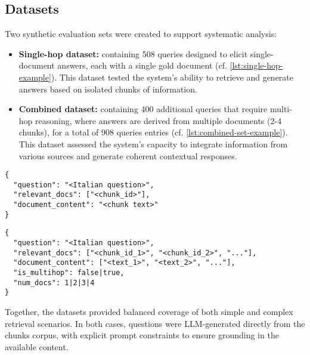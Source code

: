 \begin{spacing}{1.5}
\subsection{Datasets}\label{sec:datasets}

Two synthetic evaluation sets were created to support systematic analysis:
\begin{itemize}
      \item \textbf{Single-hop dataset:} containing 508 queries designed to elicit single-document answers, each with a single gold document (cf. \autoref{lst:single-hop-example}). This dataset tested the system's ability to retrieve and generate answers based on isolated chunks of information.
      \item \textbf{Combined dataset:} containing 400 additional queries that require multi-hop reasoning, where answers are derived from multiple documents (2-4 chunks), for a total of 908 queries entries (cf. \autoref{lst:combined-set-example}). This dataset assessed the system's capacity to integrate information from various sources and generate coherent contextual responses.
\end{itemize}


\begin{lstlisting}[frame=none,
                   caption={JSON output format for single-hop dataset items.},
                   captionpos=b,
                   label={lst:single-hop-example},
  xleftmargin=0.2\textwidth,
  xrightmargin=0.2\textwidth]
{
  "question": "<Italian question>",
  "relevant_docs": ["<chunk_id>"],
  "document_content": "<chunk text>"
}
\end{lstlisting}

\vspace{0.6em}

\begin{lstlisting}[frame=none,
                   caption={JSON output format for combined dataset items, including single-hop and multi-hop questions.},
                   captionpos=b,
                   label={lst:combined-set-example},
  xleftmargin=0.05\textwidth,
  xrightmargin=0.05\textwidth]
{
  "question": "<Italian question>",
  "relevant_docs": ["<chunk_id_1>", "<chunk_id_2>", "..."],
  "document_content": ["<text_1>", "<text_2>", "..."],
  "is_multihop": false|true,
  "num_docs": 1|2|3|4
}
\end{lstlisting}
\vspace{0.6em}

Together, the datasets provided balanced coverage of both simple and complex retrieval scenarios. In both cases, questions were LLM-generated directly from the chunks corpus, with explicit prompt constraints to ensure grounding in the available content.



\end{spacing}
